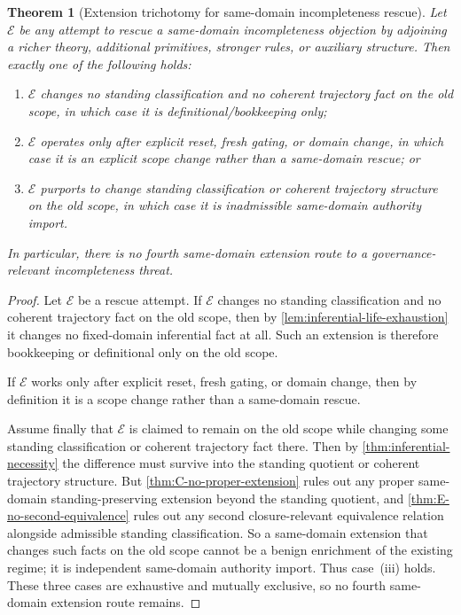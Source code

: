 \documentclass[11pt]{article}
\theoremstyle{plain}
\newtheorem{theorem}{Theorem}[section]
\theoremstyle{definition}
\begin{document}
\begin{theorem}[Extension trichotomy for same-domain incompleteness rescue]
\label{thm:extension-trichotomy}
Let $\mathcal E$ be any attempt to rescue a same-domain incompleteness objection by adjoining a richer theory, additional primitives, stronger rules, or auxiliary structure. Then exactly one of the following holds:
\begin{enumerate}[label=(\roman*), leftmargin=2.5em]
    \item $\mathcal E$ changes no standing classification and no coherent trajectory fact on the old scope, in which case it is definitional/bookkeeping only;
    \item $\mathcal E$ operates only after explicit reset, fresh gating, or domain change, in which case it is an explicit scope change rather than a same-domain rescue; or
    \item $\mathcal E$ purports to change standing classification or coherent trajectory structure on the old scope, in which case it is inadmissible same-domain authority import.
\end{enumerate}
In particular, there is no fourth same-domain extension route to a governance-relevant incompleteness threat.
\end{theorem}

\begin{proof}
Let $\mathcal E$ be a rescue attempt. If $\mathcal E$ changes no standing classification and no coherent trajectory fact on the old scope, then by \cref{lem:inferential-life-exhaustion} it changes no fixed-domain inferential fact at all. Such an extension is therefore bookkeeping or definitional only on the old scope.

If $\mathcal E$ works only after explicit reset, fresh gating, or domain change, then by definition it is a scope change rather than a same-domain rescue.

Assume finally that $\mathcal E$ is claimed to remain on the old scope while changing some standing classification or coherent trajectory fact there. Then by \cref{thm:inferential-necessity} the difference must survive into the standing quotient or coherent trajectory structure. But \cref{thm:C-no-proper-extension} rules out any proper same-domain standing-preserving extension beyond the standing quotient, and \cref{thm:E-no-second-equivalence} rules out any second closure-relevant equivalence relation alongside admissible standing classification. So a same-domain extension that changes such facts on the old scope cannot be a benign enrichment of the existing regime; it is independent same-domain authority import. Thus case~(iii) holds. These three cases are exhaustive and mutually exclusive, so no fourth same-domain extension route remains.
\end{proof}
\end{document}
